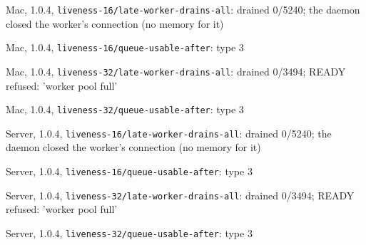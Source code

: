 \item Mac, 1.0.4, \texttt{liveness-16/late-worker-drains-all}: drained 0/5240; the daemon closed the worker's connection (no memory for it)
\item Mac, 1.0.4, \texttt{liveness-16/queue-usable-after}: type 3
\item Mac, 1.0.4, \texttt{liveness-32/late-worker-drains-all}: drained 0/3494; READY refused: 'worker pool full'
\item Mac, 1.0.4, \texttt{liveness-32/queue-usable-after}: type 3
\item Server, 1.0.4, \texttt{liveness-16/late-worker-drains-all}: drained 0/5240; the daemon closed the worker's connection (no memory for it)
\item Server, 1.0.4, \texttt{liveness-16/queue-usable-after}: type 3
\item Server, 1.0.4, \texttt{liveness-32/late-worker-drains-all}: drained 0/3494; READY refused: 'worker pool full'
\item Server, 1.0.4, \texttt{liveness-32/queue-usable-after}: type 3
